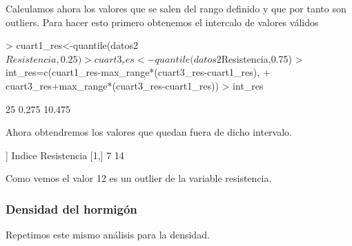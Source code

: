 \documentclass [a4paper] {article}
\begin{document}
Calculamos ahora los valores que se salen del rango definido y que por tanto son outliers.
Para hacer esto primero obtenemos el intercalo de valores válidos
\begin{center}
\begin{Schunk}
\begin{Sinput}
> cuart1_res<-quantile(datos2$Resistencia,0.25)
> cuart3_res<-quantile(datos2$Resistencia,0.75)
> int_res=c(cuart1_res-max_range*(cuart3_res-cuart1_res),
+           cuart3_res+max_range*(cuart3_res-cuart1_res))
> int_res
\end{Sinput}
\begin{Soutput}
   25%
 0.275 10.475 
\end{Soutput}
\end{Schunk}
Ahora obtendremos los valores que quedan fuera de dicho intervalo.
\begin{Schunk}
\begin{Soutput}
[[1]]
     Indice Resistencia
[1,]      7          14
\end{Soutput}
\end{Schunk}
\end{center}
Como vemos el valor 12 es un outlier de la variable resistencia.

\subsubsection{Densidad del hormigón}
Repetimos este mismo análisis para la densidad.
\end{document}
